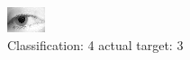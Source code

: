 \begin{figure}[h!]
\begin{center}
\includegraphics[width=0.60\columnwidth]{figures/ID1327_class_4_target_3.png}
\end{center}
\caption{ Classification: 4 actual target: 3}
\label{fig:ID1327_class_4_target_3}
\end{figure}
